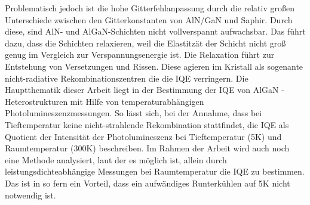 Problematisch jedoch ist die hohe Gitterfehlanpassung durch die relativ großen Unterschiede zwischen den Gitterkonstanten von AlN/GaN und Saphir.
Durch diese, sind AlN- und AlGaN-Schichten nicht vollverspannt aufwachsbar. Das führt dazu, dass die Schichten relaxieren, weil die Elastitzät der Schicht nicht groß genug im Vergleich zur Verspannungsenergie ist. Die Relaxation führt zur Entstehung von Versetzungen und Rissen. Diese agieren im Kristall als sogenante nicht-radiative Rekombinationszentren die die 
IQE verringern. 
\newline 
Die Hauptthematik dieser Arbeit liegt in der  Bestimmung der IQE von AlGaN - Heterostrukturen mit Hilfe von temperaturabhängigen Photolumineszenzmessungen. So lässt sich, bei der Annahme, dass bei Tieftemperatur keine nicht-strahlende Rekombination stattfindet, die IQE als Quotient der Intensität der Photolumineszenz bei Tieftemperatur (5K) und Raumtemperatur (300K) beschreiben. Im Rahmen der Arbeit wird auch noch eine Methode analysiert, laut der es möglich ist, allein durch leistungsdichteabhängige Messungen bei Raumtemperatur die IQE zu bestimmen. Das ist in so fern ein Vorteil, dass ein aufwändiges Runterkühlen auf 5K nicht notwendig ist. 














